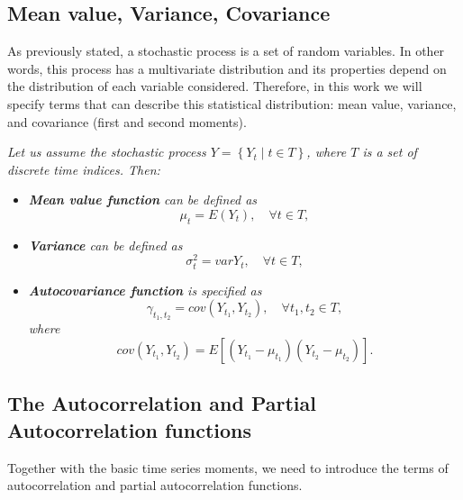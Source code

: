 \subsection{Mean value, Variance, Covariance}

As previously stated, a stochastic process is a set of random variables. In other words, this process has a multivariate distribution and its properties depend on the distribution of each variable considered. Therefore, in this work we will specify terms that can describe this statistical distribution: mean value, variance, and covariance (first and second moments).

\begin{definition}
\textit{Let us assume the stochastic process $ Y = \left\{Y_{t}\;|\;t \in T\right\}$, where $T$ is a set of discrete time indices. Then:}
\begin{itemize}
    \item{\textit{\textbf{Mean value function} can be defined as} 
    \begin{equation}
    \mu_{t} = E(Y_{t}), \quad \forall t \in T,
    \label{eq_mean_value}
    \end{equation}}
    \item{\textit{\textbf{Variance} can be defined as 
    \begin{equation}
    \sigma^{2}_{t} = var Y_{t}, \quad \forall t \in T,
    \label{eq_variance}   
    \end{equation}}} 
    \item{\textit{\textbf{Autocovariance function} is specified as} \begin{equation}
    \gamma_{t_1, t_2} = cov(Y_{t_1}, Y_{t_2}), \quad \forall t_1, t_2 \in T,
    \label{eq_autocov_func}
    \end{equation} 
    \textit{where 
    \begin{equation}
    cov(Y_{t_1}, Y_{t_2}) = E[(Y_{t_1} - \mu_{t_1})(Y_{t_2} - \mu_{t_2})].
    \label{eq_covariance}
    \end{equation}}}
\end{itemize}
\end{definition}

\subsection{The Autocorrelation and Partial Autocorrelation functions}

Together with the basic time series moments, we need to introduce the terms of autocorrelation and partial autocorrelation functions. 

